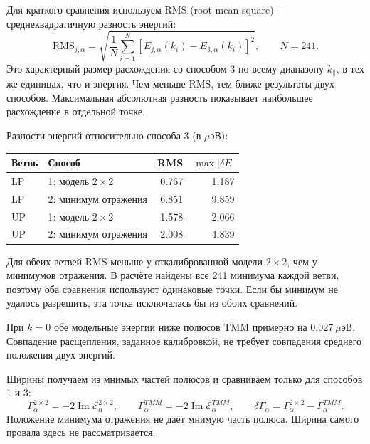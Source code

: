 \documentclass[12pt,a4paper]{article}
\begin{document}
Для краткого сравнения используем RMS (root mean square) --- среднеквадратичную разность энергий:
\[
\mathrm{RMS}_{j,\alpha}=
\sqrt{\frac{1}{N}\sum_{i=1}^{N}
\left[E_{j,\alpha}(k_i)-E_{3,\alpha}(k_i)\right]^2},
\qquad N=241.
\]
Это характерный размер расхождения со способом 3 по всему диапазону $k_\parallel$, в тех же единицах, что и энергия. Чем меньше RMS, тем ближе результаты двух способов. Максимальная абсолютная разность показывает наибольшее расхождение в отдельной точке.

\par\noindent\begin{minipage}{\textwidth}
Разности энергий относительно способа 3 (в $\mu\text{эВ}$):
\begin{center}\small\begin{tabular}{llrr}\toprule
Ветвь & Способ & RMS & $\max|\delta E|$ \\\midrule
LP & 1: модель $2\times2$ & 0.767 & 1.187 \\
LP & 2: минимум отражения & 6.851 & 9.859 \\
UP & 1: модель $2\times2$ & 1.578 & 2.066 \\
UP & 2: минимум отражения & 2.008 & 4.839 \\
\bottomrule\end{tabular}\end{center}
\end{minipage}\par

Для обеих ветвей RMS меньше у откалиброванной модели $2\times2$, чем у минимумов отражения. В расчёте найдены все 241 минимума каждой ветви, поэтому оба сравнения используют одинаковые точки. Если бы минимум не удалось разрешить, эта точка исключалась бы из обоих сравнений.

При $k=0$ обе модельные энергии ниже полюсов TMM примерно на $0.027\ \mu$эВ. Совпадение расщепления, заданное калибровкой, не требует совпадения среднего положения двух энергий.

\par\noindent\begin{minipage}{\textwidth}
Ширины получаем из мнимых частей полюсов и сравниваем только для способов 1 и 3:
\[
\Gamma_\alpha^{2\times2}=-2\operatorname{Im}\mathcal E_\alpha^{2\times2},
\qquad \Gamma_\alpha^{TMM}=-2\operatorname{Im}\mathcal E_\alpha^{TMM},
\qquad \delta\Gamma_\alpha=\Gamma_\alpha^{2\times2}-\Gamma_\alpha^{TMM}.
\]
Положение минимума отражения не даёт мнимую часть полюса. Ширина самого провала здесь не рассматривается.
\end{minipage}\par
\end{document}
